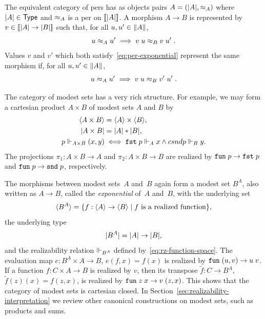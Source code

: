 The equivalent category of pers has as objects pairs $A = (|A|,
{\approx_A})$ where $|A| \in \mathsf{Type}$ and $\approx_A$ is a per on
$[\![|A|]\!]$. A morphism $A \to B$ is represented by $v
\in [\![|A| \to |B|]\!]$ such that, for all $u, u'
\in \|A\|$,
%
\begin{equation}
  \label{eq:per-exponential}
  u \approx_A u' \implies v\;u \approx_B v\;u' \;.
\end{equation}
%
Values $v$ and $v'$ which both satisfy~\eqref{eq:per-exponential}
represent the same morphism if, for all $u, u' \in \|A\|$,
%
\begin{equation*}
  u \approx_A u' \implies v\;u \approx_B v'\;u' \;.
\end{equation*}

The category of modest sets has a very rich structure. For example, we
may form a cartesian product $A \times B$ of modest sets $A$ and $B$
by
%
\begin{align*}
  \langle A \times B \rangle &= \langle A \rangle \times \langle B \rangle,\\
  |A \times B| &= |A| * |B|,\\
  p \Vdash_{A \times B} (x,y) &\iff
  \mathtt{fst}\;p \Vdash_A x \land csnd{p} \Vdash_B y.
\end{align*}
%
The projections $\pi_1 : A \times B \to A$ and $\pi_2 : A \times B \to
B$ are realized by $\mathtt{fun}\;p \to \mathtt{fst}\;p$ and $\mathtt{fun}\;p \to \mathtt{snd}\;p$,
respectively.

The morphisms between modest sets~$A$ and~$B$ again form a modest set
$B^A$, also written as $A \to B$, called the \emph{exponential} of~$A$
and~$B$, with the underlying set
%
\begin{equation*}
  \langle B^A \rangle =
  \{f : \langle A \rangle \to \langle B \rangle \mid \text{$f$ is a realized function}\},
\end{equation*}
%
the underlying type
%
\begin{equation*}
  |B^A| = |A| \to |B|,
\end{equation*}
%
and the realizability relation $\Vdash_{B^A}$ defined
by~\eqref{eq:rz-function-space}. The evaluation map $e : B^A \times A
\to B$, $e(f,x) = f(x)$ is realized by $\mathtt{fun}\;(u,v) \to u\;v$. If a
function $f : C \times A \to B$ is realized by $v$, then its transpose
$\tilde{f} : C \to B^A$, $\tilde{f}(z)(x) = f(z,x)$, is realized by
$\mathtt{fun}\;z\;x \to v \; (z,x)$. This shows that the category of modest sets
is cartesian closed. In Section~\ref{sec:realizability-interpretation}
we review other canonical constructions on modest sets, such as
products and sums.


